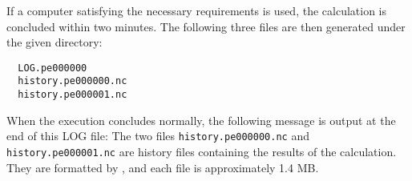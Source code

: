 If a computer satisfying the necessary requirements is used,
the calculation is concluded within two minutes.
The following three files are then generated under the given directory:
\begin{verbatim}
  LOG.pe000000
  history.pe000000.nc
  history.pe000001.nc
\end{verbatim}
When the execution concludes normally,
the following message is output at the end of this LOG file:
The two files \verb|history.pe000000.nc| and \verb|history.pe000001.nc| are history files containing the results of the calculation. They are formatted by \netcdf, and each file is approximately 1.4 MB. 
